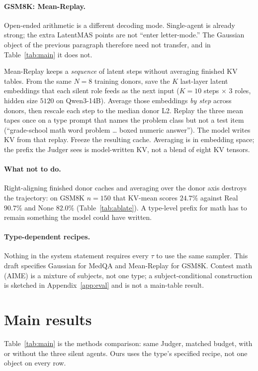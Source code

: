 \documentclass[11pt]{article}
\begin{document}
\paragraph{GSM8K: Mean-Replay.}
Open-ended arithmetic is a different decoding mode.
Single-agent is already strong; the extra LatentMAS points are not
``enter letter-mode.''
The Gaussian object of the previous paragraph therefore need not
transfer, and in Table~\ref{tab:main} it does not.

Mean-Replay keeps a \emph{sequence} of latent steps without averaging
finished KV tables.
From the same $N{=}8$ training donors, save the $K$ last-layer latent
embeddings that each silent role feeds as the next input ($K{=}10$
steps $\times$ $3$ roles, hidden size $5120$ on Qwen3-14B).
Average those embeddings \emph{by step} across donors, then rescale each
step to the median donor L2.
Replay the three mean tapes once on a type prompt that names the
problem class but not a test item (``grade-school math word problem \ldots
boxed numeric answer'').
The model writes KV from that replay.
Freeze the resulting cache.
Averaging is in embedding space; the prefix the Judger sees is
model-written KV, not a blend of eight KV tensors.

\paragraph{What not to do.}
Right-aligning finished donor caches and averaging over the donor axis
destroys the trajectory: on GSM8K $n{=}150$ that KV-mean scores
$24.7\%$ against Real $90.7\%$ and None $82.0\%$
(Table~\ref{tab:ablate}).
A type-level prefix for math has to remain something the model could
have written.

\paragraph{Type-dependent recipes.}
Nothing in the system statement requires every $\tau$ to use the same
sampler.
This draft specifies Gaussian for MedQA and Mean-Replay for GSM8K.
Contest math (AIME) is a mixture of subjects, not one type; a
subject-conditional construction is sketched in Appendix~\ref{app:eval}
and is not a main-table result.

\section{Main results}
\label{sec:results}

Table~\ref{tab:main} is the methods comparison: same Judger, matched
budget, with or without the three silent agents.
Ours uses the type's specified recipe, not one object on every row.
\end{document}
